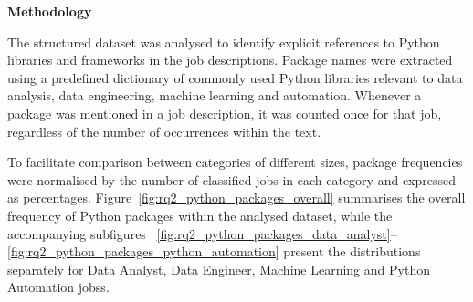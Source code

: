 \textbf{Methodology}

The structured dataset was analysed to identify explicit references to Python libraries and frameworks in the job descriptions. Package names were
extracted using a predefined dictionary of commonly used Python libraries relevant to data analysis, data engineering, machine learning and
automation. Whenever a package was mentioned in a job description, it was counted once for that job, regardless of the number of occurrences within
the text.

To facilitate comparison between categories of different sizes, package frequencies were normalised by the number of classified jobs in each category
and expressed as percentages. Figure~\ref{fig:rq2_python_packages_overall} summarises the overall frequency of Python packages within the analysed dataset,
while the accompanying subfigures ~\ref{fig:rq2_python_packages_data_analyst}--\ref{fig:rq2_python_packages_python_automation} present the distributions separately for Data Analyst, Data Engineer, Machine Learning and Python Automation jobss.

